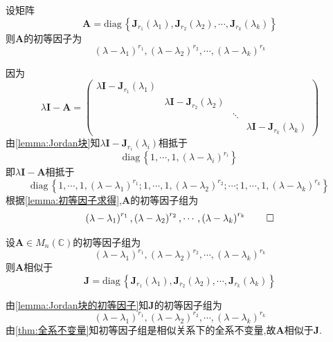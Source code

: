 \begin{green}
\begin{lemma}[Jordan块的初等因子]\label{lemma:Jordan块的初等因子}
    设矩阵\[
    \bm{A}=\mathrm{diag}\,\left\{
        \bm{J}_{r_1}\left(\lambda_1\right),\bm{J}_{r_2}\left(\lambda_2\right),\cdots,\bm{J}_{r_k}\left(\lambda_k\right)
    \right\}
    \]则$\bm{A}$的初等因子为\[
    \left(\lambda-\lambda_1\right)^{r_1},\left(\lambda-\lambda_2\right)^{r_2},\cdots,\left(\lambda-\lambda_k\right)^{r_k}
    \]
\end{lemma}
\begin{Proof}
因为\[
\lambda\bm{I}-\bm{A}=\begin{pmatrix}
    \lambda\bm{I}-\bm{J}_{r_1}\left(\lambda_1\right)&&&\\
    &\lambda\bm{I}-\bm{J}_{r_2}\left(\lambda_2\right)&&\\
    &&\ddots&\\
    &&&\lambda\bm{I}-\bm{J}_{r_k}\left(\lambda_k\right)
\end{pmatrix}
\]由\cref{lemma:Jordan块}知$\lambda\bm{I}-\bm{J}_{r_i}\left(\lambda_i\right)$相抵于\[
\mathrm{diag}\,\left\{
    1,\cdots,1,\left(\lambda-\lambda_i\right)^{r_i}
\right\}
\]即$\lambda\bm{I}-\bm{A}$相抵于\[
\mathrm{diag}\,\left\{
    1,\cdots,1,\left(\lambda-\lambda_1\right)^{r_1};1,\cdots,1,\left(\lambda-\lambda_2\right)^{r_2};\cdots;1,\cdots,1,\left(\lambda-\lambda_k\right)^{r_k}
\right\}
\]根据\cref{lemma:初等因子求得},$\bm{A}$的初等因子组为\[
\left(\lambda-\lambda_1\right)^{r_1},\left(\lambda-\lambda_2\right)^{r_2},\cdots,\left(\lambda-\lambda_k\right)^{r_k}\qedhere
\]
\end{Proof}
\end{green}
\begin{formal}
\begin{theorem}[Jordan标准型]\label{thm:Jordan标准型}
    设$\bm{A}\in M_n\left(\mathbb{C}\right)$的初等因子组为\[
    \left(\lambda-\lambda_1\right)^{r_1},\left(\lambda-\lambda_2\right)^{r_2},\cdots,\left(\lambda-\lambda_k\right)^{r_k}
    \]则$\bm{A}$相似于\[
    \bm{J}= \mathrm{diag}\,\left\{
        \bm{J}_{r_1}\left(\lambda_1\right),\bm{J}_{r_2}\left(\lambda_2\right),\cdots,\bm{J}_{r_k}\left(\lambda_k\right)
    \right\}
        \]
\end{theorem}
\begin{Proof}
由\cref{lemma:Jordan块的初等因子}知$\bm{J}$的初等因子组为\[
\left(\lambda-\lambda_1\right)^{r_1},\left(\lambda-\lambda_2\right)^{r_2},\cdots,\left(\lambda-\lambda_k\right)^{r_k}
\]由\cref{thm:全系不变量}知初等因子组是相似关系下的全系不变量,故$\bm{A}$相似于$\bm{J}$.
\end{Proof}
\end{formal}
